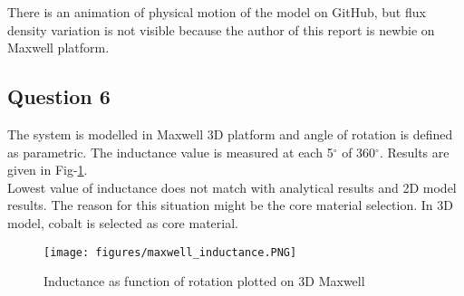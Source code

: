 \documentclass[11pt, a4paper]{article}
\begin{document}
There is an animation of physical motion of the model on GitHub, but flux density variation is not visible because the author of this report is newbie on Maxwell platform.

\subsection*{Question 6}

The system is modelled in Maxwell 3D platform and angle of rotation is defined as parametric. The inductance value is measured at each 5$^\circ$ of 360$^\circ$. Results are given in Fig-\ref{maxwell_inductance}.\\

Lowest value of inductance does not match with analytical results and 2D model results. The reason for this situation might be the core material selection. In 3D model, cobalt is selected as core material.

\begin{figure}[ht]
\centering
\texttt{[image: figures/maxwell\_inductance.PNG]}
\caption{Inductance as function of rotation plotted on 3D Maxwell} 
\label{maxwell_inductance}
\end{figure}


\end{document}
